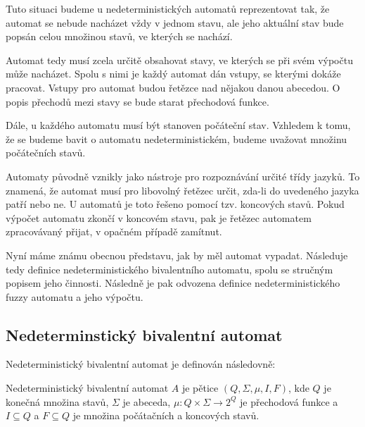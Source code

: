 \documentclass[a4paper,10pt]{article}
\begin{document}
Tuto situaci budeme u nedeterministických automatů reprezentovat tak, že automat se nebude nacházet vždy v jednom stavu, ale jeho aktuální stav bude popsán celou množinou stavů, ve kterých se nachází.

Automat tedy musí zcela určitě obsahovat stavy, ve kterých se při svém výpočtu může nacházet. Spolu s nimi je každý automat dán vstupy, se kterými dokáže pracovat. Vstupy pro automat budou řetězce nad nějakou danou abecedou. O popis přechodů mezi stavy se bude starat přechodová funkce.

Dále, u každého automatu musí být stanoven počáteční stav. Vzhledem k tomu, že se budeme bavit o automatu nedeterministickém, budeme uvažovat množinu počátečních stavů.

Automaty původně vznikly jako nástroje pro rozpoznávání určité třídy jazyků.
To znamená, že automat musí pro libovolný řetězec určit, zda-li do uvedeného jazyka patří nebo ne. U automatů je toto řešeno pomocí tzv. koncových stavů. Pokud výpočet automatu zkončí v koncovém stavu, pak je řetězec automatem zpracovávaný přijat, v opačném případě zamítnut.

Nyní máme známu obecnou představu, jak by měl automat vypadat. Následuje tedy definice nedeterministického bivalentního automatu, spolu se stručným popisem jeho činnosti. Následně je pak odvozena definice nedeterministického fuzzy automatu a jeho výpočtu.


\subsection{Nedeterminstický bivalentní automat}
Nedeterministický bivalentní automat je definován následovně:

\begin{definition}\label{def-NedBivAut}
 Nedeterministický bivalentní automat $A$ je pětice $(Q, \Sigma, \mu, I, F)$, kde $Q$ je konečná množina stavů, $\Sigma$ je abeceda, $\mu: Q \times \Sigma \rightarrow 2^Q$ je přechodová funkce a $I \subseteq Q$ a $F \subseteq Q$ je množina počátačních a koncových stavů.
\end{definition}
\end{document}
